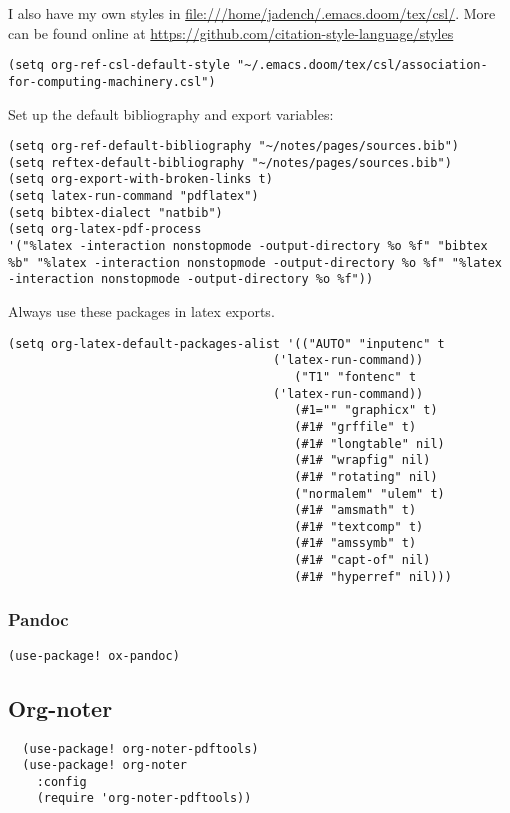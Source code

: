 \documentclass[11pt]{article}
\begin{document}
I also have my own styles in \url{file:///home/jadench/.emacs.doom/tex/csl/}. More can be found online at \url{https://github.com/citation-style-language/styles}
\begin{verbatim}
(setq org-ref-csl-default-style "~/.emacs.doom/tex/csl/association-for-computing-machinery.csl")
\end{verbatim}

Set up the default bibliography and export variables:
\begin{verbatim}
(setq org-ref-default-bibliography "~/notes/pages/sources.bib")
(setq reftex-default-bibliography "~/notes/pages/sources.bib")
(setq org-export-with-broken-links t)
(setq latex-run-command "pdflatex")
(setq bibtex-dialect "natbib")
(setq org-latex-pdf-process
'("%latex -interaction nonstopmode -output-directory %o %f" "bibtex %b" "%latex -interaction nonstopmode -output-directory %o %f" "%latex -interaction nonstopmode -output-directory %o %f"))
\end{verbatim}

Always use these packages in latex exports.
\begin{verbatim}
(setq org-latex-default-packages-alist '(("AUTO" "inputenc" t
                                     ('latex-run-command))
                                        ("T1" "fontenc" t
                                     ('latex-run-command))
                                        (#1="" "graphicx" t)
                                        (#1# "grffile" t)
                                        (#1# "longtable" nil)
                                        (#1# "wrapfig" nil)
                                        (#1# "rotating" nil)
                                        ("normalem" "ulem" t)
                                        (#1# "amsmath" t)
                                        (#1# "textcomp" t)
                                        (#1# "amssymb" t)
                                        (#1# "capt-of" nil)
                                        (#1# "hyperref" nil)))

\end{verbatim}

\subsubsection{Pandoc}
\label{sec:orgb0c84e6}
\begin{verbatim}
(use-package! ox-pandoc)
\end{verbatim}

\subsection{Org-noter}
\label{sec:org054b694}
\begin{verbatim}
  (use-package! org-noter-pdftools)
  (use-package! org-noter
    :config
    (require 'org-noter-pdftools))
\end{verbatim}
\end{document}
